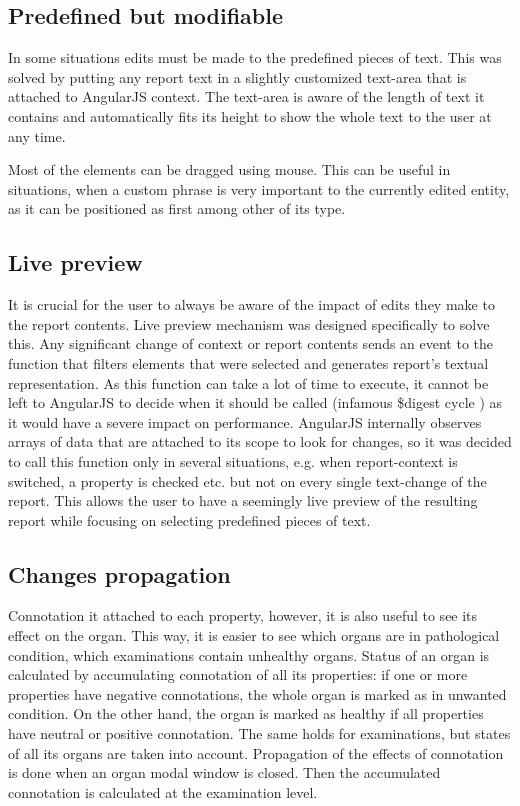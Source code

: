 \documentclass[12pt, twoside, openany]{report}
\theoremstyle{definition}
\begin{document}
\subsection{Predefined but modifiable}
In some situations edits must be made to the predefined pieces of text. This was solved by putting any report text in a slightly customized text-area that is attached to AngularJS context. The text-area is aware of the length of text it contains and automatically fits its height to show the whole text to the user at any time.

Most of the elements can be dragged using mouse. This can be useful in situations, when a custom phrase is very important to the currently edited entity, as it can be positioned as first among other of its type.


\subsection{Live preview}\label{live-preview}
It is crucial for the user to always be aware of the impact of edits they make to the report contents. Live preview mechanism was designed specifically to solve this. Any significant change of context or report contents sends an event to the function that filters elements that were selected and generates report's textual representation. As this function can take a lot of time to execute, it cannot be left to AngularJS to decide when it should be called (infamous \$digest cycle \cite{angular-digest}) as it would have a severe impact on performance. AngularJS internally observes arrays of data that are attached to its scope to look for changes, so it was decided to call this function only in several situations, e.g. when report-context is switched, a property is checked etc. but not on every single text-change of the report. This allows the user to have a seemingly live preview of the resulting report while focusing on selecting predefined pieces of text.

\subsection{Changes propagation}\label{changes-propagation}
Connotation it attached to each property, however, it is also useful to see its effect on the organ. This way, it is easier to see which organs are in pathological condition, which examinations contain unhealthy organs. Status of an organ is calculated by accumulating connotation of all its properties: if one or more properties have negative connotations, the whole organ is marked as in unwanted condition. On the other hand, the organ is marked as healthy if all properties have neutral or positive connotation.
The same holds for examinations, but states of all its organs are taken into account. Propagation of the effects of connotation is done when an organ modal window is closed. Then the accumulated connotation is calculated at the examination level.
\end{document}
